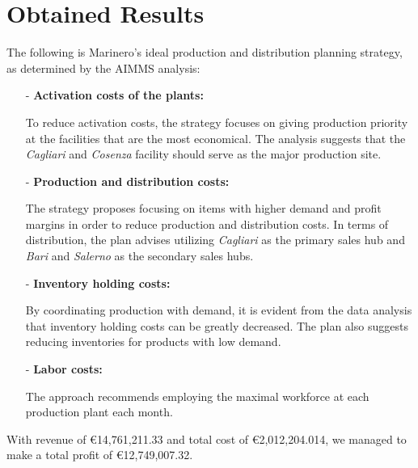 \documentclass [a4paper,12pt,titlepage]{article}
\begin{document}
\newpage

\section*{Obtained Results}


The following is Marinero's ideal production and distribution planning strategy, as determined by the AIMMS analysis:

\begin{enumerate}
    \item[-] \textbf{Activation costs of the plants:}
    
    To reduce activation costs, the strategy focuses on giving production priority at the facilities that are the most economical. The analysis suggests that the \textit{Cagliari} and \textit{Cosenza} facility should serve as the major production site.

    \item[-] \textbf{Production and distribution costs:}

    The strategy proposes focusing on items with higher demand and profit margins in order to reduce production and distribution costs. In terms of distribution, the plan advises utilizing \textit{Cagliari} as the primary sales hub and \textit{Bari} and \textit{Salerno} as the secondary sales hubs.

    \item[-] \textbf{Inventory holding costs:}

    By coordinating production with demand, it is evident from the data analysis that inventory holding costs can be greatly decreased. The plan also suggests reducing inventories for products with low demand.

    \item[-] \textbf{Labor costs:}
    
    The approach recommends employing the maximal workforce at each production plant each month.
\end{enumerate}

With revenue of \euro{14,761,211.33} and total cost of \euro{2,012,204.014}, we managed to make a total profit of \euro{12,749,007.32}.
\end{document}
